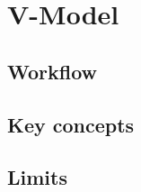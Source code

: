 \section{V-Model}\label{sec:v-model}


\subsection{Workflow}\label{subsec:workflow}

\subsection{Key concepts}\label{subsec:key-concepts}

\subsection{Limits}\label{subsec:limits}